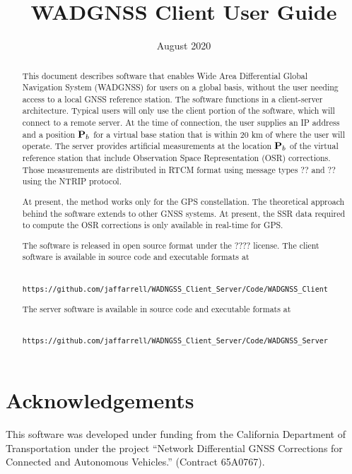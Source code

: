 



\title{WADGNSS Client User Guide}
\date{August 2020}


	\maketitle


\tableofcontents


\begin{abstract}
	This document describes software that enables Wide Area Differential Global Navigation System (WADGNSS) for users on a global basis, without the user needing access to a local GNSS reference station.
	The software functions in a client-server architecture. 
	Typical users will only use the client portion of the software, which will connect to a remote server. 
	At the time of connection, the user supplies an IP address and a position $\mathbf{P}_b$ for a virtual base station that is within 20 km of where the user will operate.
	The server provides artificial measurements at the location $\mathbf{P}_b$ of the virtual reference station that include Observation Space Representation (OSR) corrections. 
	Those measurements are distributed in RTCM format using message types \red ?? and ?? \black using the NTRIP protocol. 
	
	At present, the method works only for the GPS constellation. 
	The theoretical approach behind the software extends to other GNSS systems.
	At present, the SSR data required to compute the OSR corrections is only available in real-time for GPS.  
	
	
	The software is released in open source format under the \green ???? \black license.
	The client software is available in source code and executable formats at 
	\begin{verbatim}
 		https://github.com/jaffarrell/WADNGSS_Client_Server/Code/WADGNSS_Client 
	\end{verbatim}
	The server software is available in source code and executable formats at 
	\begin{verbatim}
 		https://github.com/jaffarrell/WADNGSS_Client_Server/Code/WADGNSS_Server
	\end{verbatim}
\end{abstract}

\vfill
\section*{Acknowledgements}
This software was developed under funding from the California Department of Transportation under the project ``Network Differential GNSS Corrections for Connected and Autonomous Vehicles.'' (Contract 65A0767).

